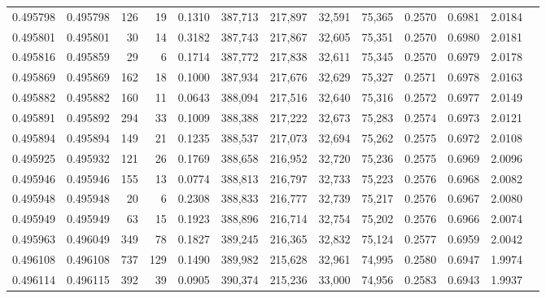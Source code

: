 \begin{tabular}{rrrrrrrrrrrrr}
0.495798 & 0.495798 &   126 &    19 &                                     0.1310 & 387,713 & 217,897 &  32,591 &  75,365 & 0.2570 & 0.6981 & 2.0184 \\
0.495801 & 0.495801 &    30 &    14 &                                     0.3182 & 387,743 & 217,867 &  32,605 &  75,351 & 0.2570 & 0.6980 & 2.0181 \\
0.495816 & 0.495859 &    29 &     6 &                                     0.1714 & 387,772 & 217,838 &  32,611 &  75,345 & 0.2570 & 0.6979 & 2.0178 \\
0.495869 & 0.495869 &   162 &    18 &                                     0.1000 & 387,934 & 217,676 &  32,629 &  75,327 & 0.2571 & 0.6978 & 2.0163 \\
0.495882 & 0.495882 &   160 &    11 &                                     0.0643 & 388,094 & 217,516 &  32,640 &  75,316 & 0.2572 & 0.6977 & 2.0149 \\
0.495891 & 0.495892 &   294 &    33 &                                     0.1009 & 388,388 & 217,222 &  32,673 &  75,283 & 0.2574 & 0.6973 & 2.0121 \\
0.495894 & 0.495894 &   149 &    21 &                                     0.1235 & 388,537 & 217,073 &  32,694 &  75,262 & 0.2575 & 0.6972 & 2.0108 \\
0.495925 & 0.495932 &   121 &    26 &                                     0.1769 & 388,658 & 216,952 &  32,720 &  75,236 & 0.2575 & 0.6969 & 2.0096 \\
0.495946 & 0.495946 &   155 &    13 &                                     0.0774 & 388,813 & 216,797 &  32,733 &  75,223 & 0.2576 & 0.6968 & 2.0082 \\
0.495948 & 0.495948 &    20 &     6 &                                     0.2308 & 388,833 & 216,777 &  32,739 &  75,217 & 0.2576 & 0.6967 & 2.0080 \\
0.495949 & 0.495949 &    63 &    15 &                                     0.1923 & 388,896 & 216,714 &  32,754 &  75,202 & 0.2576 & 0.6966 & 2.0074 \\
0.495963 & 0.496049 &   349 &    78 &                                     0.1827 & 389,245 & 216,365 &  32,832 &  75,124 & 0.2577 & 0.6959 & 2.0042 \\
0.496108 & 0.496108 &   737 &   129 &                                     0.1490 & 389,982 & 215,628 &  32,961 &  74,995 & 0.2580 & 0.6947 & 1.9974 \\
0.496114 & 0.496115 &   392 &    39 &                                     0.0905 & 390,374 & 215,236 &  33,000 &  74,956 & 0.2583 & 0.6943 & 1.9937 \\

\end{tabular}
